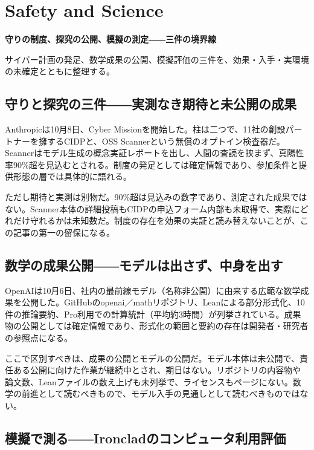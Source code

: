 \section{Safety and Science}
\begin{wideflow}
{\Large\bfseries 守りの制度、探究の公開、模擬の測定――三件の境界線\par}
\smallskip
{\color{SurveyMuted}サイバー計画の発足、数学成果の公開、模擬評価の三件を、効果・入手・実環境の未確定とともに整理する。\par}
\end{wideflow}

\subsection*{守りと探究の三件――実測なき期待と未公開の成果}

Anthropicは10月8日、Cyber Missionを開始した。柱は二つで、11社の創設パートナーを擁するCIDPと、OSS Scannerという無償のオプトイン検査器だ。Scannerはモデル生成の概念実証レポートを出し、人間の査読を挟まず、真陽性率90\%超を見込むとされる。制度の発足としては確定情報であり、参加条件と提供形態の層では具体的に語れる。\cite{cybermission}

ただし期待と実測は別物だ。90\%超は見込みの数字であり、測定された成果ではない。Scanner本体の詳細投稿もCIDPの申込フォーム内部も未取得で、実際にどれだけ守れるかは未知数だ。制度の存在を効果の実証と読み替えないことが、この記事の第一の留保になる。\cite{cybermission}

\subsection*{数学の成果公開――モデルは出さず、中身を出す}

OpenAIは10月6日、社内の最前線モデル（名称非公開）に由来する広範な数学成果を公開した。GitHubのopenai／mathリポジトリ、Leanによる部分形式化、10件の推論要約、Pro利用での計算統計（平均約3時間）が列挙されている。成果物の公開としては確定情報であり、形式化の範囲と要約の存在は開発者・研究者の参照点になる。\cite{mathrelease}

ここで区別すべきは、成果の公開とモデルの公開だ。モデル本体は未公開で、責任ある公開に向けた作業が継続中とされ、期日はない。リポジトリの内容物や論文数、Leanファイルの数え上げも未列挙で、ライセンスもページにない。数学の前進として読むべきもので、モデル入手の見通しとして読むべきものではない。\cite{mathrelease}

\subsection*{模擬で測る――Ironcladのコンピュータ利用評価}

